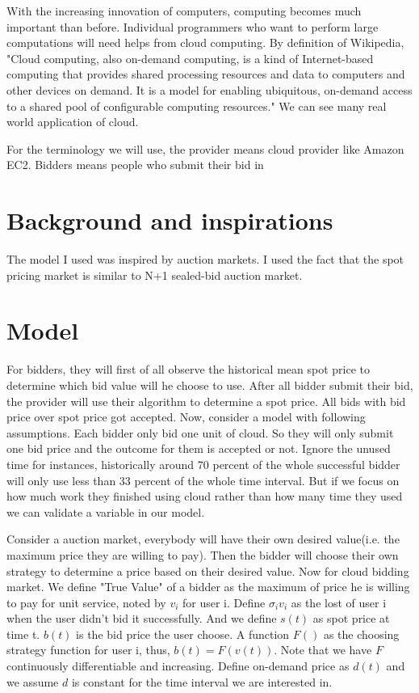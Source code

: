 \documentclass[11pt]{article}
\begin{document}
With the increasing innovation of computers, computing becomes much important than before. Individual programmers who want to perform large computations will need helps from cloud computing. By definition of Wikipedia, "Cloud computing, also on-demand computing, is a kind of Internet-based computing that provides shared processing resources and data to computers and other devices on demand. It is a model for enabling ubiquitous, on-demand access to a shared pool of configurable computing resources." We can see many real world application of cloud.

For the terminology we will use, the provider means cloud provider like Amazon EC2. Bidders means people who submit their bid in 

\section{Background and inspirations}

The model I used was inspired by auction markets. I used the fact that the spot pricing market is similar to N+1 sealed-bid auction market.

\section{Model}

For bidders, they will first of all observe the historical mean spot price to determine which bid value will he choose to use. After all bidder submit their bid, the provider will use their algorithm to determine a spot price. All bids with bid price over spot price got accepted. Now, consider a model with following assumptions. Each bidder only bid one unit of cloud. So they will only submit one bid price and the outcome for them is accepted or not. Ignore the unused time for instances, historically around 70 percent of the whole successful bidder will only use less than 33 percent of the whole time interval. But if we focus on how much work they finished using cloud rather than how many time they used we can validate a variable in our model.

Consider a auction market, everybody will have their own desired value(i.e. the maximum price they are willing to pay). Then the bidder will choose their own strategy to determine a price based on their desired value. Now for cloud bidding market. We define "True Value" of a bidder as the maximum of price he is willing to pay for unit service, noted by $v_i$ for user i. Define $\sigma_i v_i$ as the lost of user i when the user didn't bid it successfully. And we define $s(t)$ as spot price at time t. $b(t)$ is the bid price the user choose. A function $F()$ as the choosing strategy function for user i, thus, $b(t)=F(v(t))$. Note that we have $F$ continuously differentiable and increasing. Define on-demand price as $d(t)$ and we assume $d$ is constant for the time interval we are interested in.
\end{document}
